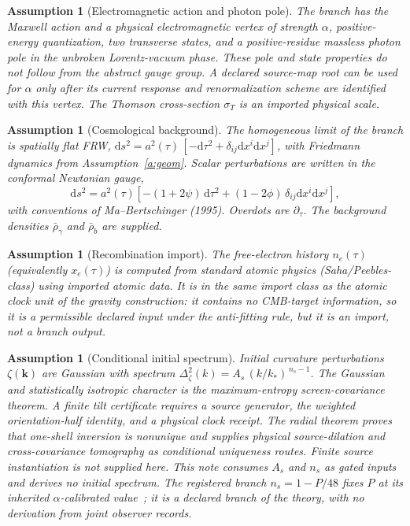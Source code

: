 \documentclass[11pt]{article}
\newtheorem{assumption}[theorem]{Assumption}
\theoremstyle{remark}
\newcommand{\Dd}{\mathrm{d}}
\begin{document}
\begin{assumption}[Electromagnetic action and photon pole]\label{a:qed}
The branch has the Maxwell action and a physical electromagnetic vertex
of strength \(\alpha\), positive-energy quantization, two transverse
states, and a positive-residue massless photon pole in the unbroken
Lorentz-vacuum phase. These pole and state properties do not follow from
the abstract gauge group. A declared source-map root can be used for
\(\alpha\) only after its current response and renormalization scheme
are identified with this vertex. The Thomson cross-section
\(\sigma_T\) is an imported physical scale.
\end{assumption}

\begin{assumption}[Cosmological background]\label{a:bg}
The homogeneous limit of the branch is spatially flat FRW,
$\Dd s^2=a^2(\tau)\,[-\Dd\tau^2+\delta_{ij}\Dd x^i\Dd x^j]$, with Friedmann
dynamics from Assumption~\ref{a:geom}. Scalar perturbations are written in
the conformal Newtonian gauge,
\[
\Dd s^2=a^2(\tau)\left[-(1+2\psi)\,\Dd\tau^2+(1-2\phi)\,\delta_{ij}\Dd
x^i\Dd x^j\right],
\]
with conventions of Ma--Bertschinger (1995). Overdots are $\partial_\tau$.
The background densities $\bar\rho_\gamma$ and $\bar\rho_b$ are supplied.
\end{assumption}

\begin{assumption}[Recombination import]\label{a:rec}
The free-electron history $n_e(\tau)$ (equivalently $x_e(\tau)$) is computed
from standard atomic physics (Saha/Peebles-class) using imported atomic data.
It is in the same import class as the atomic clock unit of the gravity
construction: it contains no CMB-target information, so it is a permissible declared input
under the anti-fitting rule, but it is an import, not a branch output.
\end{assumption}

\begin{assumption}[Conditional initial spectrum]\label{a:init}
Initial curvature perturbations $\zeta(\mathbf k)$ are Gaussian with spectrum
$\Delta^2_\zeta(k)=A_s\,(k/k_\ast)^{\,n_s-1}$. The Gaussian and
statistically isotropic character is the maximum-entropy screen-covariance
theorem. A finite tilt certificate requires a source generator, the weighted
orientation-half identity, and a physical clock receipt. The radial theorem
proves that one-shell inversion is nonunique and supplies physical
source-dilation and cross-covariance tomography as conditional uniqueness
routes. Finite source instantiation is not supplied here. This note consumes
\(A_s\) and \(n_s\) as gated inputs and derives no initial spectrum. The
registered branch \(n_s=1-P/48\) fixes \(P\) at its inherited
\(\alpha\)-calibrated value~\cite{ophpublicdata}; it is a declared branch
of the theory, with no derivation from joint observer records.
\end{assumption}
\end{document}
